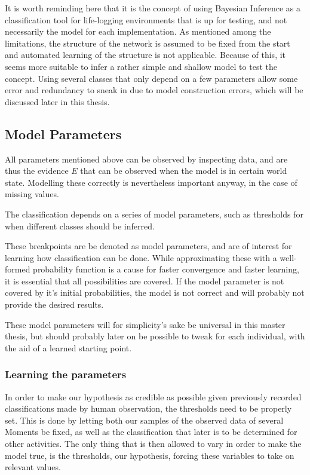 It is worth reminding here that it is the concept of using Bayesian 
Inference as a classification tool for life-logging environments that 
is up for testing, and not necessarily the model for each 
implementation. As mentioned among the limitations, the structure of
the network is assumed to be fixed from the start and automated learning
of the structure is not applicable. 
Because of this, it seems more suitable to infer a rather 
simple and shallow model to test the concept. Using several classes
that only depend on a few parameters allow some error and redundancy 
to sneak in due to model construction errors, which will be discussed 
later in this thesis.  

\subsection{Model Parameters}
All parameters mentioned above can be observed by inspecting data, and 
are thus the evidence $E$ that can be observed when the model is in certain 
world state. Modelling these correctly is nevertheless important anyway, in 
the case of missing values. 

The classification depends on a series of model parameters, such as thresholds
for when different classes should be inferred. 

These breakpoints are be denoted as model parameters, and are of interest for
learning how classification can be done. While approximating these with a 
well-formed probability function is a cause for faster convergence and faster
learning, it is essential that all possibilities are covered. If the model 
parameter is not covered by it's initial probabilities, the model is not 
correct and will probably not provide the desired results. 

These model parameters will for simplicity's sake be universal in this master
thesis, but should probably later on be possible to tweak for each individual, 
with the aid of a learned starting point.

\subsubsection{Learning the parameters}
In order to make our hypothesis as credible as possible given previously 
recorded classifications made by human observation, the thresholds need to
be properly set. This is done by letting both our samples of the observed
data of several Moments be fixed, as well as the classification that later
is to be determined for other activities. The only thing that is then allowed
to vary in order to make the model true, is the thresholds, our hypothesis, 
forcing these variables to take on relevant values. 

